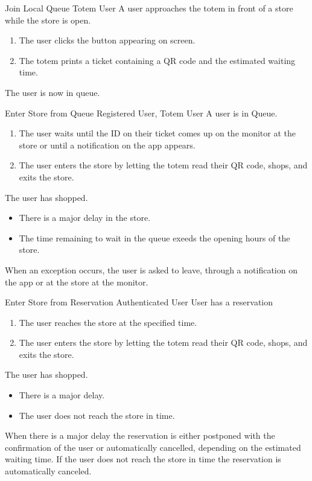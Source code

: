 \usecase
{Join Local Queue}
{Totem User}
{A user approaches the totem in front of a store while the store is open.}
{
    \begin{enumerate}
        \item The user clicks the button appearing on screen.
        \item The totem prints a ticket containing a QR code and the estimated waiting time.
    \end{enumerate}
}
{
    The user is now in queue.
}
{}
{}


\usecase
{Enter Store from Queue}
{Registered User, Totem User}
{A user is in Queue.}
{
    \begin{enumerate}
        \item The user waits until the ID on their ticket comes up on the monitor at the store or until a notification on the app appears.
        \item The user enters the store by letting the totem read their QR code, shops, and exits the store.
    \end{enumerate}
}
{
    The user has shopped.
}
{
    \begin{itemize}
        \item There is a major delay in the store. 
        \item The time remaining to wait in the queue exeeds the opening hours of the store. 
    \end{itemize}
}
{
    When an exception occurs, the user is asked to leave, through a notification on the app or at the store at the monitor. 
}

\usecase
{Enter Store from Reservation}
{Authenticated User}
{User has a reservation}
{
        \begin{enumerate}
            \item The user reaches the store at the specified time.
            \item The user enters the store by letting the totem read their QR code, shops, and exits the store.
        \end{enumerate}
}
{
    The user has shopped.
}
{
    \begin{itemize}
        \item There is a major delay.
        \item The user does not reach the store in time.
    \end{itemize}
}
{
    When there is a major delay the reservation is either postponed with the confirmation of the user or automatically cancelled, depending on the estimated waiting time.
    If the user does not reach the store in time the reservation is automatically canceled.
}

